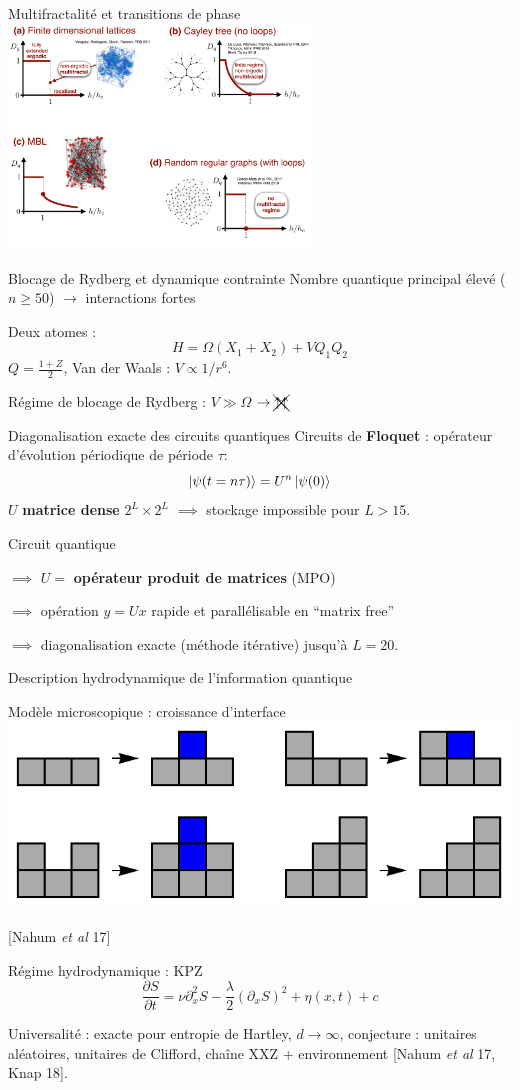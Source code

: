 \begin{frame}{Multifractalité et transitions de phase}
\centering
\includegraphics[width=0.6\textwidth]{img/4_questions/Dq}
\end{frame}

\begin{frame}{Blocage de Rydberg et dynamique contrainte}
Nombre quantique principal élevé ($n \geq 50$) $\to$ interactions fortes

Deux atomes :
\[
	H = \Omega( X_1 + X_2) + V Q_1 Q_2
\]
$Q = \frac{1 + Z}{2}$, Van der Waals : $V \propto 1/r^6$.

Régime de blocage de Rydberg : $V \gg \Omega$ $\to \xcancel{\uparrow \uparrow}$
\end{frame}

\begin{frame}{Diagonalisation exacte des circuits quantiques}
Circuits de \textbf{Floquet} : opérateur d'évolution périodique de période $\tau$:
\[
	\ket{\psi(t = n \tau)} = U^n \ket{\psi(0)}
\]
$U$ \textbf{matrice dense} $2^L \times 2^L$ $\implies$ stockage impossible pour $L > 15$.

Circuit quantique 

$\implies$ $U = $ \textbf{opérateur produit de matrices} (MPO) 

$\implies$ opération $y = U x$ rapide et parallélisable en ``matrix free''

$\implies$ diagonalisation exacte (méthode itérative) jusqu'à $L = 20$.

\end{frame}

\begin{frame}{Description hydrodynamique de l'information quantique}
\begin{block}{Modèle microscopique : croissance d'interface}
\centering
\includegraphics[width=0.4\columnwidth]{img/4_questions/applyingUnitary}

\footnotesize{[Nahum \emph{et al} 17]}
\end{block}
Régime hydrodynamique : KPZ
\[
	\frac{\partial S}{\partial t} = \nu \partial_x^2 S - \frac{\lambda}{2} (\partial_x S)^2 + \eta(x,t) + c
\]

Universalité : exacte pour entropie de Hartley, $d \to \infty$, conjecture : unitaires aléatoires, unitaires de Clifford, chaîne XXZ + environnement \footnotesize{[Nahum \emph{et al} 17, Knap 18]}.
\end{frame}

